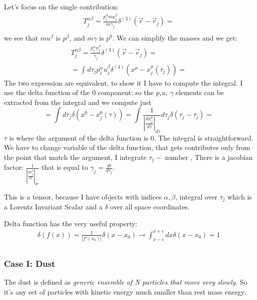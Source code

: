Let's focus on the single contribution:
\begin{gather*}
T^{\alpha \beta }_{j} = \frac{p^{\alpha }_{j} m u^{\beta }_{j}}{m \gamma_{j}} \delta^{\left( 3 \right)}\left( \vec{r}-\vec{r}_{j} \right) =\\
\end{gather*}
we see that $m u^{\beta }$ is $p^{\beta }$, and $m \gamma $ is $p^{0}$. We can simplify the masses and we get:
\begin{gather*}
T^{\alpha \beta }_{j} = \frac{p^{\alpha }_{j} u^{\beta }_{j}}{ \gamma_{j}} \delta^{\left( 3 \right)}\left( \vec{r}-\vec{r}_{j} \right) =\\
= \int_{}^{}{d\tau_{j} p^{\alpha }_{j} u^{\beta }_{j} \delta^{\left( 4 \right)}\left( x^{\mu }-x^{\mu }_{j}\left( \tau_{j} \right) \right)} =
\end{gather*}
The two expression are equivalent, to show it I have to compute the integral. I use the delta function of the 0 component: so the \emph{p,u, $\gamma $} elements can be extracted from the integral and we compute just
\begin{equation}
	= \int_{}^{}{d\tau_{j} \delta\left( x^{0}-x^{0}_{j}\left( \tau  \right) \right)} = \int_{}^{}{\frac{1}{\left| \frac{dx^{0}_{j}}{d\tau }\right|_{d\overline{\tau }}} d\tau_{j} \delta\left( \tau_{j}-\overline{\tau_{j}} \right)}= 
\end{equation}
$\overline{\tau }$ is where the argument of the delta function is 0. The integral is straightforward. We have to change variable of the delta function, that gets contributes only from the point that match the argument, I integrate $\tau_{j} - \text{ number }$, There is a jacobian factor: $\frac{1}{\left| \frac{dx^{0}_{j}}{d\tau }\right|_{d\overline{\tau }}}$ that is equal to $\gamma_{j} = \frac{dt}{d\tau_{j}}$.

This is a tensor, because I have objects with indices $\alpha, \beta $, integral over $\tau_{j}$ which is a Lorentz Invariant Scalar and a $\delta $ over all space coordinates.

Delta function has the very useful property:
\begin{gather*}
\delta\left( f\left( x \right) \right) = \frac{1}{\left| f'\left( x_{0} \right)\right|} \delta\left( x-x_{0} \right) \to \int_{x-\epsilon }^{x+\epsilon }{dx \delta \left( x-x_{0} \right)}=1\\
\end{gather*}

\subsubsection{Case I: Dust}
The dust is defined as \emph{generic ensemble of N particles that move very slowly}. So it's any set of particles with kinetic energy much smaller than rest mass energy.

